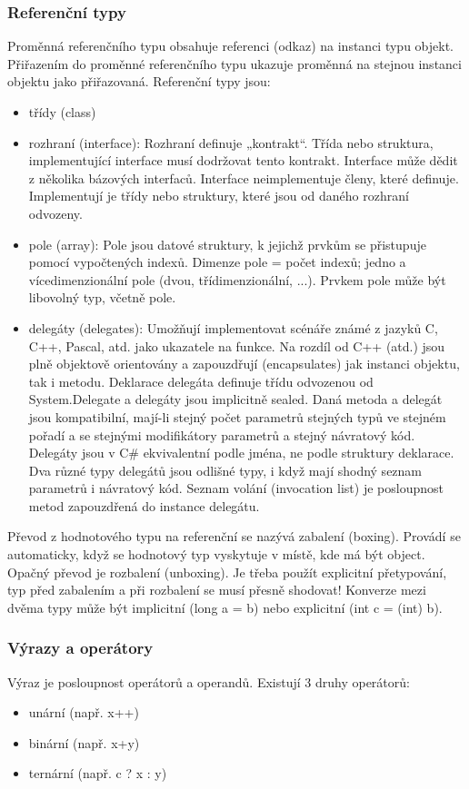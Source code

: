 \subsubsection*{Referenční typy}
Proměnná referenčního typu obsahuje referenci (odkaz) na instanci typu objekt. Přiřazením do proměnné referenčního typu ukazuje proměnná na stejnou instanci objektu jako přiřazovaná. Referenční typy jsou:
\begin{itemize}
\item třídy (class)
\item rozhraní (interface): Rozhraní definuje „kontrakt“. Třída nebo struktura, implementující interface musí dodržovat tento kontrakt. Interface může dědit z několika bázových interfaců. Interface neimplementuje členy, které definuje. Implementují je třídy nebo struktury, které jsou od daného rozhraní odvozeny.
\item pole (array): Pole jsou datové struktury, k jejichž prvkům se přistupuje pomocí vypočtených indexů. Dimenze pole = počet indexů; jedno a vícedimenzionální pole (dvou, třídimenzionální, ...). Prvkem pole může být libovolný typ, včetně pole.
\item delegáty (delegates): Umožňují implementovat scénáře známé z jazyků C, C++, Pascal, atd. jako ukazatele na funkce. Na rozdíl od C++ (atd.) jsou plně objektově orientovány a zapouzdřují (encapsulates) jak instanci objektu, tak i metodu. Deklarace delegáta definuje třídu odvozenou od System.Delegate a delegáty jsou implicitně sealed. Daná metoda a delegát jsou kompatibilní, mají-li stejný počet parametrů stejných typů ve stejném pořadí a se stejnými
modifikátory parametrů a stejný návratový kód. Delegáty jsou v C\# ekvivalentní podle jména, ne podle struktury deklarace. Dva různé typy delegátů jsou odlišné typy, i když mají shodný seznam parametrů i návratový kód. Seznam volání (invocation list) je posloupnost metod zapouzdřená do instance delegátu.
\end{itemize}

Převod z hodnotového typu na referenční se nazývá zabalení (boxing). Provádí se automaticky, když se hodnotový typ vyskytuje v místě, kde má být object. Opačný převod je rozbalení (unboxing). Je třeba použít explicitní přetypování, typ před zabalením a při rozbalení se musí přesně shodovat! Konverze mezi dvěma typy může být implicitní (long a = b) nebo explicitní (int c = (int) b).

\subsubsection*{Výrazy a operátory}
Výraz je posloupnost operátorů a operandů. Existují 3 druhy operátorů:
\begin{itemize}
\item unární (např. x++)
\item binární (např. x+y)
\item ternární (např. c ? x : y)
\end{itemize}

